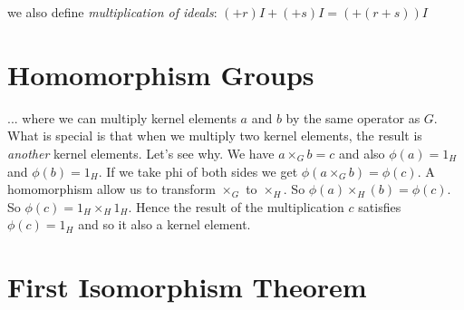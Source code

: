 we also define \textit{multiplication of ideals}: $(+r)I + (+s)I = (+(r+s))I$

\section{Homomorphism Groups}



... where we can multiply kernel elements $a$ and $b$ by the same operator as $G$. 
What is special is that when we multiply two kernel elements, the result is \textit{another}
kernel elements. Let's see why. We have $a \times_G b = c$ and also $\phi(a) = 1_H$ and $\phi(b) = 1_H$.
If we take phi of both sides we get $\phi(a \times_G b) = \phi(c)$. 
A homomorphism allow us to transform $\times_G$ to $\times_H$. 
So $\phi(a) \times_H (b) = \phi(c)$. So $\phi(c) = 1_H \times_H 1_H$.
Hence the result of the multiplication $c$ satisfies $\phi(c) = 1_H$ and so it also a kernel element.




\section{First Isomorphism Theorem}